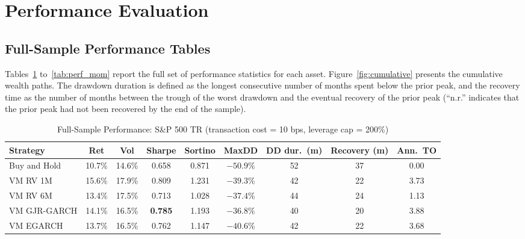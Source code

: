 \documentclass[12pt, a4paper]{article}
\begin{document}
\section{Performance Evaluation}
\label{sec:performance}

\subsection{Full-Sample Performance Tables}

Tables~\ref{tab:perf_spxt} to~\ref{tab:perf_mom} report the full set of performance
statistics for each asset. Figure~\ref{fig:cumulative} presents the cumulative wealth
paths. The drawdown duration is defined as the longest consecutive number of months
spent below the prior peak, and the recovery time as the number of months between the
trough of the worst drawdown and the eventual recovery of the prior peak (``n.r.''
indicates that the prior peak had not been recovered by the end of the sample).

\begin{table}[H]
  \centering
  \caption{Full-Sample Performance: S\&P 500 TR (transaction cost = 10 bps, leverage cap = 200\%)}
  \label{tab:perf_spxt}
  \footnotesize
  \begin{tabular}{lcccccccc}
    \toprule
    \textbf{Strategy} & \textbf{Ret} & \textbf{Vol} & \textbf{Sharpe} & \textbf{Sortino}
                      & \textbf{MaxDD} & \textbf{DD dur.\ (m)} & \textbf{Recovery (m)}
                      & \textbf{Ann.\ TO} \\
    \midrule
    Buy and Hold      & 10.7\% & 14.6\% & 0.658          & 0.871 & $-50.9$\% & 52 & 37 & 0.00 \\
    VM RV 1M          & 15.6\% & 17.9\% & 0.809          & 1.231 & $-39.3$\% & 42 & 22 & 3.73 \\
    VM RV 6M          & 13.4\% & 17.5\% & 0.713          & 1.028 & $-37.4$\% & 44 & 24 & 1.13 \\
    VM GJR-GARCH      & 14.1\% & 16.5\% & \textbf{0.785} & 1.193 & $-36.8$\% & 40 & 20 & 3.88 \\
    VM EGARCH         & 13.7\% & 16.5\% & 0.762          & 1.147 & $-40.6$\% & 42 & 22 & 3.68 \\
    \bottomrule
  \end{tabular}
\end{table}
\end{document}
